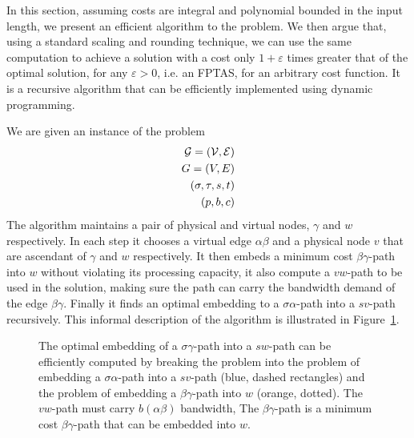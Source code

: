 In this section, 
assuming costs are integral and polynomial bounded in the input length,
we present an efficient algorithm to the \VPN{} problem.
We then argue that, using a standard scaling and rounding technique, we can use
the same computation to achieve a solution with a cost only
$1 + \varepsilon$ times greater that of the optimal solution, for any
$\varepsilon > 0$, i.e. an FPTAS, for an arbitrary cost function.
It is a recursive algorithm that can be efficiently implemented using dynamic
programming.

We are given an instance of the \VPN{} problem 
\begin{align*}
\mathcal{G} = (\mathcal{V}, \mathcal{E})		\\
G = (V, E)		\\
(\sigma , \tau , s, t)	\\
(p, b, c)
\end{align*}
The algorithm maintains a pair of physical and virtual nodes,
$\gamma$ and $w$ respectively.
In each step it chooses a virtual edge $\alpha\beta$ and a physical node $v$
that are ascendant of $\gamma$ and $w$ respectively.
It then embeds a minimum cost $\beta\gamma$-path into $w$ 
without violating its processing capacity,
it also compute a $vw$-path to be used in the solution, 
making sure the path can carry the bandwidth demand of the edge $\beta\gamma$.
Finally it finds an optimal embedding to a $\sigma\alpha$-path into a $sv$-path 
recursively.
This informal description of the algorithm is illustrated in Figure~\ref{fig:dp1}.

\begin{figure}[ht]
\centering

\caption[]{
\label{fig:dp1}
The optimal embedding of a $\sigma \gamma $-path into a $sw$-path can be
efficiently computed by breaking the problem into the problem of embedding 
a $\sigma\alpha$-path into a $sv$-path (blue, dashed rectangles) 
and the problem of embedding a $\beta\gamma$-path into $w$ (orange, dotted).
The $vw$-path must carry $b(\alpha\beta)$ bandwidth, 
The $\beta\gamma$-path is a minimum cost $\beta\gamma$-path 
that can be embedded into $w$.
}
\end{figure}


